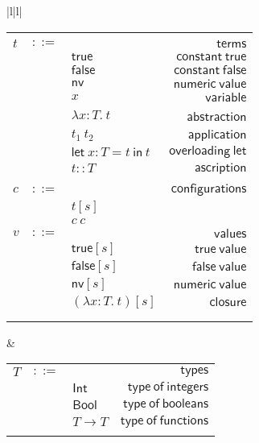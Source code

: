 \documentclass[preprint,authoryear,sort&compress,9pt,nocopyrightspace]{article}
\newcommand{\conf}[2][s]{(#2)[#1]}
\newcommand{\ascrip}[1]{#1::T}
\newcommand{\oletD}{\mathsf{let} \ x : T = t \ \mathsf{in}  \ t}
\newcommand{\app}[2]{#1 \ #2}
\newcommand{\abs}[3]{\lambda #1:#2. \ #3}
\newcommand{\truet}{\mathsf{true}}
\newcommand{\falset}{\mathsf{false}}
\newcommand{\boolt}{\mathsf{Bool}}
\newcommand{\intt}{\mathsf{Int}}
\newcommand{\nvt}{\mathsf{nv}}
\begin{document}
\begin{figure}
\begin{small}
\begin{center}
\begin{tabular}{|l|l|}
\hline
\begin{tabular}{l c l r}
&&&\\
$t$&$::=$&&$\mathsf {terms}$\\
&&$\truet$&$\mathsf {constant \ true}$\\
&&$\falset$&$\mathsf {constant \ false}$\\
&&$\nvt$&$\mathsf {numeric \ value}$\\
&&$x$&$\mathsf {variable}$\\
&&$\abs {x}{T}{t}$&\ $\mathsf {abstraction}$\\
&&$\app {t_1}{t_2}$&$\mathsf {application}$\\
&&$\oletD$&$\mathsf {overloading \ let}$\\
&&$\ascrip {t}$&$\mathsf {ascription}$\\
&&&\\
$c$&$::=$&&$\mathsf {configurations}$\\
&&$t[s]$&\\
&&$c \ c $&\\
$v$&$::=$&&$\mathsf {values}$\\
&&$\truet[s]$&$\mathsf {true \ value}$\\
&&$\falset[s]$&$\mathsf {false \ value}$\\
&&$\nvt[s]$&$\mathsf {numeric \ value}$\\
&&$\conf {\abs {x}{T}{t}}$&$\mathsf {closure}$\\
&&&\\
&&&\\
\end{tabular}
& \begin{tabular}{l c l r}
$T$&$::=$&&$\mathsf {types}$\\
&&$\intt$&$\mathsf {type \ of \ integers}$\\
&&$\boolt$&$\mathsf {type \ of \ booleans}$\\
&&$T \to T$&$\mathsf {type \ of \ functions}$\\
&&&\\

\end{tabular}
\end{tabular}
\end{center}
\end{small}
\end{figure}
\end{document}
